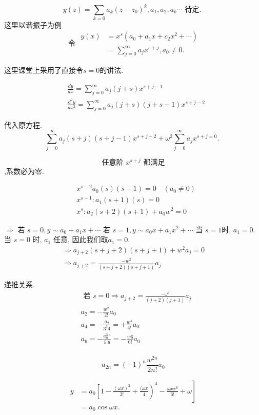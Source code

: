 $$
y(z)=\sum_{k=0} a_k\left(z-z_0\right)^k, a_1, a_2, a_k \cdots \text { 待定. }
$$
这里以谐振子为例
$$
\text { 令 } \begin{aligned}
y(x) & =x^s\left(a_0+a_1 x+c_2 x^2+\cdots\right) \\
& =\sum_{j=0}^{\infty} a_j x^{s+j}, a_0 \neq 0 .
\end{aligned}
$$

\begin{note}
这里课堂上采用了直接令$s=0$的讲法.
\end{note}
$$
\begin{aligned}
& \frac{d y}{d x}=\sum_{j=0}^{\infty} a_j(j+s) x^{s+j-1} \\
& \frac{d^2 y}{d x^2}=\sum_{j=0}^{\infty} a_j(j+s)(j+s-1) x^{s+j-2}
\end{aligned}
$$

代入原方程.
$$
\sum_{j=0}^{\infty} a_j(s+j)(s+j-1) x^{s+j-2}+\omega^2 \sum_{j=0}^{\infty} a_j x^{s+j=0} \text {. }
$$

$$
\text { 任意阶 } x^{s+j} \text { 都满足 }
$$
,系数必为零.

$$
\begin{aligned}
& x^{s-2} a_0(s)(s-1)=0 \quad\left(a_0 \neq 0\right) \\
& x^{s-1}: a_1(s+1)(s)=0 \\
& x^s: a_2(s+2)(s+1)+a_0 w^2=0
\end{aligned}
$$

$\Rightarrow$ 若 $s=0, y \sim  a_0+a_1 x+\cdots$
若 $s=1, y \sim a_0 x+a_1 x^2+\cdots$
当 $s=1$时, $a_1=0$.
当 $s=0$ 时, $a_1$ 任意, 因此我们取$a_1=0$.
$$
\begin{gathered}
\Rightarrow a_{j+2}(s+j+2)(s+j+1)+w^2 a_j=0 \\
\Rightarrow a_{j+2}=\frac{-w^2}{(s+j+2)(s+j+1)} a_j
\end{gathered}
$$

递推关系.
$$
\begin{aligned}
& \text { 若 } s=0 \Rightarrow a_{j+2}=\frac{-\omega^2}{(j+2)(j+1)} a_j \\
& a_2=-\frac{w^2}{2 !} a_0 \\
& a_4=-\frac{a_2}{3^3 4}=+\frac{w^4}{4 !} a_0 \\
& a_6=-\frac{a_0^{3.4}}{5.6}=-\frac{w 6}{6 !} a_0 \\
&
\end{aligned}
$$

$$
a_{2 n}=(-1)^n \frac{w^{2 n}}{2 n !} a_0
$$

$$
\begin{aligned}
y & \left.=a_0\left[1-\frac{(\omega x)^2}{2 !}+\frac{(\omega x}{4}\right)^4-\frac{\omega x x^6}{6 !}+\omega\right] \\
& =a_0 \cos \omega x .
\end{aligned}
$$

